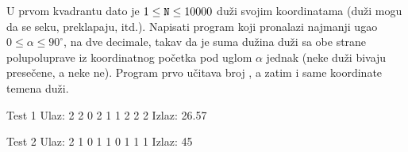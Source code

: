 \begin{Answer}[ref=409]
\end{Answer}
\begin{Exercise}[difficulty=2, label=410]
  U prvom kvadrantu dato je $1 \leq \texttt{N} \leq 10000$ duži svojim
  koordinatama (duži mogu da se seku, preklapaju, itd.). Napisati
  program koji pronalazi najmanji ugao $0 \leq \alpha \leq 90^\circ$,
  na dve decimale, takav da je suma dužina duži sa obe strane
  polupoluprave iz koordinatnog početka pod uglom $\alpha$ jednak
  (neke duži bivaju presečene, a neke ne). Program prvo učitava broj
  , a zatim i same koordinate temena duži. 
  
\begin{minitest}
\begin{test}{Test 1}
Ulaz:
  2
  2 0 2 1
  1 2 2 2
Izlaz: 26.57 
\end{test}
\end{minitest}
\begin{minitest}
\begin{test}{Test 2}
Ulaz:
  2
  1 0 1 1
  0 1 1 1
Izlaz: 45
\end{test}
\end{minitest}


\end{Exercise}

